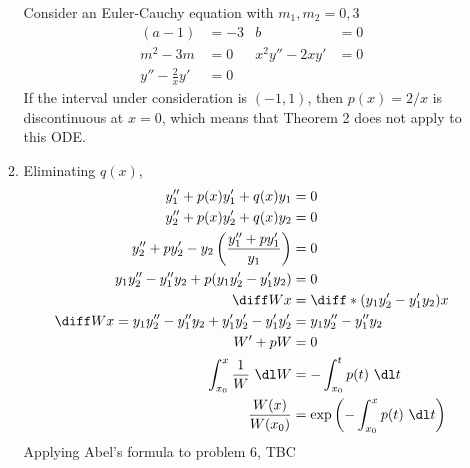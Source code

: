 \begin{enumerate}
\begin{enumerate}
                    Consider an Euler-Cauchy equation with $ m_{1}, m_{2} = 0, 3 $
                    \begin{align}
                        (a - 1)             & = -3 & b              & = 0 \\
                        m^{2}  - 3m         & = 0  & x^{2}y'' -2xy' & = 0 \\
                        y'' - \frac{2}{x}y' & = 0
                    \end{align}
                    If the interval under consideration is $ (-1, 1) $, then
                    $ p(x) = 2/x $ is discontinuous at $ x = 0 $, which means that
                    Theorem 2 does not apply to this ODE.

              \item Eliminating $ q(x) $,
                    \begin{align}
                        y_{1}'' + p(x)y_{1}' + q(x)y_{1}   & = 0                      \\
                        y_{2}'' + p(x)y_{2}' + q(x)y_{2}   & = 0                      \\
                        y_{2}'' + py_{2}' - y_{2}\left( \frac{y_{1}''
                        + py_{1}'}{y_{1}} \right)          & = 0                      \\
                        y_{1}y_{2}'' - y_{1}''y_{2} + p (y_{1}y_{2}'
                        - y_{1}'y_{2})                     & = 0                      \\
                        \diff Wx                           & = \diff* {(y_{1}y_{2}'
                        - y_{1}'y_{2})}{x}                                            \\
                        \diff Wx = y_{1}y_{2}'' - y_{1}''y_{2}
                        + y_{1}'y_{2}' - y_{1}'y_{2}'      & = y_{1}y_{2}''
                        - y_{1}''y_{2}                                                \\
                        W' + pW                            & = 0                      \\
                        \int_{x_{0}}^{x}\frac{1}{W}\ \dl W & = -\int_{x_{0}}^{t} p(t)
                        \ \dl t                                                       \\
                        \frac{W(x)}{W(x_{0})}              & = \exp
                        \left( -\int_{x_{0}}^{x} p(t)\ \dl t \right)
                    \end{align}
                    Applying Abel's formula to problem 6, TBC
          \end{enumerate}
\end{enumerate}